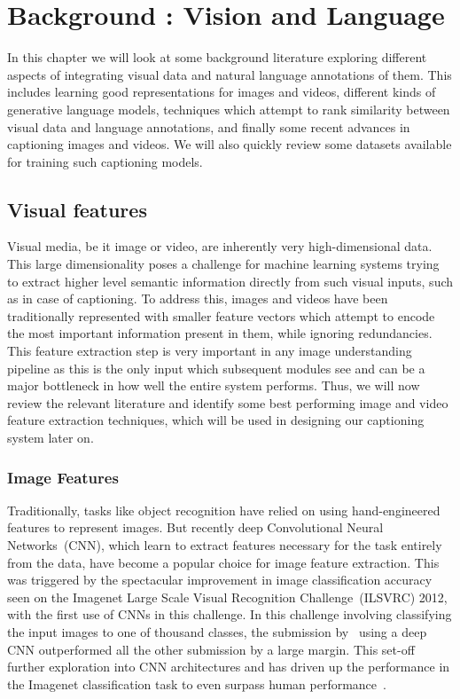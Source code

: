 \chapter{Background : Vision and Language} \label{chapter:background} 
In this chapter we will look at some background literature exploring different
aspects of integrating visual data and natural language annotations of them.
This includes learning good representations for images and videos, different
kinds of generative language models, techniques which attempt to rank similarity
between visual data and language annotations, and finally some recent advances
in captioning images and videos.
We will also quickly review some datasets available for training such captioning
models.

\section{Visual features}
Visual media, be it image or video, are inherently very high-dimensional data.
This large dimensionality poses a challenge for machine learning systems trying
to extract higher level semantic information directly from such visual inputs, such as in
case of captioning.
To address this, images and videos have been traditionally represented with
smaller feature vectors which attempt to encode the most important information
present in them, while ignoring redundancies. 
This feature extraction step is very important in any image understanding
pipeline as this is the only input which subsequent modules see and can be a
major bottleneck in how well the entire system performs. 
Thus, we will now review the relevant literature and identify some best
performing image and video feature extraction techniques, which will be used in
designing our captioning system later on.

\subsection{Image Features}
Traditionally, tasks like object recognition have relied on using
hand-engineered features to represent images. 
But recently deep Convolutional Neural Networks~(CNN), which learn to extract features
necessary for the task entirely from the data, have become a popular choice for
image feature extraction.
This was triggered by the spectacular improvement in image classification
accuracy seen on the Imagenet Large Scale Visual Recognition Challenge~(ILSVRC)
2012, with the first use of CNNs in this challenge.
In this challenge involving classifying the input images to one of thousand
classes, the submission by~\cite{Krizhevsky2012} using a deep CNN outperformed
all the other submission by a large margin.
This set-off further exploration into CNN architectures and has driven up the
performance in the Imagenet classification task to even surpass human
performance~\cite{he2015delving}.

